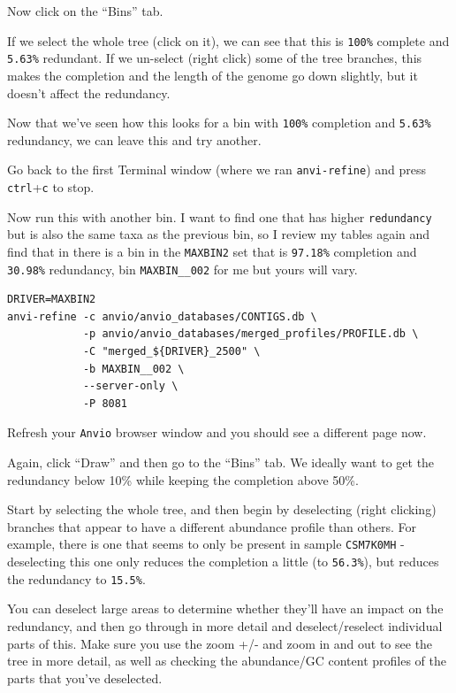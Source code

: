 \documentclass[
]{book}
\begin{document}
Now click on the ``Bins'' tab.

If we select the whole tree (click on it), we can see that this is \texttt{100\%} complete and \texttt{5.63\%} redundant. If we un-select (right click) some of the tree branches, this makes the completion and the length of the genome go down slightly, but it doesn't affect the redundancy.

Now that we've seen how this looks for a bin with \texttt{100\%} completion and \texttt{5.63\%} redundancy, we can leave this and try another.

Go back to the first Terminal window (where we ran \texttt{anvi-refine}) and press \texttt{ctrl}+\texttt{c} to stop.

Now run this with another bin. I want to find one that has higher \texttt{redundancy} but is also the same taxa as the previous bin, so I review my tables again and find that in there is a bin in the \texttt{MAXBIN2} set that is \texttt{97.18\%} completion and \texttt{30.98\%} redundancy, bin \texttt{MAXBIN\_\_002} for me but yours will vary.

\begin{verbatim}
DRIVER=MAXBIN2
anvi-refine -c anvio/anvio_databases/CONTIGS.db \
            -p anvio/anvio_databases/merged_profiles/PROFILE.db \
            -C "merged_${DRIVER}_2500" \
            -b MAXBIN__002 \
            --server-only \
            -P 8081
\end{verbatim}

Refresh your \texttt{Anvi\textquotesingle{}o} browser window and you should see a different page now.

Again, click ``Draw'' and then go to the ``Bins'' tab. We ideally want to get the redundancy below 10\% while keeping the completion above 50\%.

Start by selecting the whole tree, and then begin by deselecting (right clicking) branches that appear to have a different abundance profile than others. For example, there is one that seems to only be present in sample \texttt{CSM7K0MH} - deselecting this one only reduces the completion a little (to \texttt{56.3\%}), but reduces the redundancy to \texttt{15.5\%}.

You can deselect large areas to determine whether they'll have an impact on the redundancy, and then go through in more detail and deselect/reselect individual parts of this. Make sure you use the zoom +/- and zoom in and out to see the tree in more detail, as well as checking the abundance/GC content profiles of the parts that you've deselected.
\end{document}
